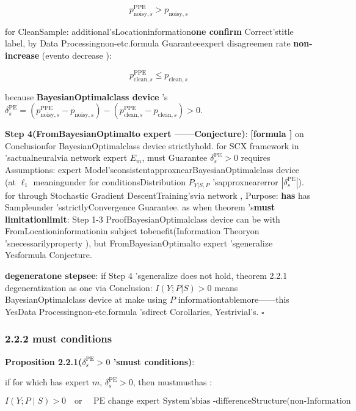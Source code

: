 \documentclass[
  12pt,
]{article}
\begin{document}
\[p_{\text{noisy}, s}^{\text{PPE}} > p_{\text{noisy}, s}\]

for CleanSample: additional'sLocationinformation\textbf{one confirm }Correct'stitle label, by Data Processingnon-etc.formula Guaranteeexpert disagreemen rate \textbf{non-increase }(evento decrease ):

\[p_{\text{clean}, s}^{\text{PPE}} \leq p_{\text{clean}, s}\]

because \textbf{BayesianOptimalclass device }'s
\(\delta_s^{\text{PE}} = (p_{\text{noisy}, s}^{\text{PPE}} - p_{\text{noisy}, s}) - (p_{\text{clean}, s}^{\text{PPE}} - p_{\text{clean}, s}) > 0\). 

\textbf{Step
4(FromBayesianOptimalto expert ------Conjecture)}: \textbf{{[}formula {]}}
on Conclusionfor BayesianOptimalclass device strictlyhold. for  SCX framework in 'sactualneuralvia network expert 
\(E_m\), must Guarantee \(\delta_s^{\text{PE}} > 0\)
requires Assumptions: expert Model'sconsistentapproxnearBayesianOptimalclass device (at  \(\ell_1\)
meaningunder for conditionsDistribution \(P_{Y|S,P}\) 'sapproxnearerror 
\(|\delta_s^{\text{PE}}|\)). for through Stochastic Gradient DescentTraining'svia network , Purpose: \textbf{has }has Sampleunder 'sstrictlyConvergence Guarantee. as when theorem 's\textbf{must limitationlimit}: Step
1-3
ProofBayesianOptimalclass device can be with FromLocationinformationin subject tobenefit(Information Theoryon 'snecessarilyproperty ), but FromBayesianOptimalto expert 'sgeneralize Yesformula Conjecture. 

\textbf{degeneratone stepsee}: if Step 4 'sgeneralize does not hold, theorem  2.2.1
degeneratization as one via Conclusion: \(I(Y;P|S) > 0\) means BayesianOptimalclass device at make using  \(P\)
informationtablemore------this YesData Processingnon-etc.formula 'sdirect Corollaries, Yestrivial's. \(\square\)

\subsubsection{2.2.2 must conditions}\label{ux5fc5ux8981ux6761ux4ef6}

\textbf{Proposition 2.2.1(\(\delta_s^{\text{PE}} > 0\) 'smust conditions)}: 

if for which has expert  \(m\), \(\delta_s^{\text{PE}} > 0\), then mustmusthas : 

\[\boxed{I(Y; P \mid S) > 0 \quad \text{or } \quad \text{PE change expert System'sbias -differenceStructure(non-Information TheoryMechanism)}}\]
\end{document}
